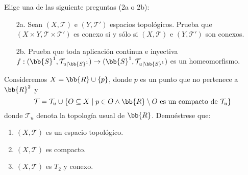 \documentclass[12pt]{article}
\newcounter{ejercicio}[section] %
\newcounter{ejercicio}
\newcommand{\resetearcontador}{%
  \setcounter{ejercicio}{0} %
}
\begin{document}
    \begin{ejercicio}[2.5 puntos]
        Elige una de las siguiente preguntas (2a o 2b):
        \begin{enumerate}
            \item[2a.] Sean $(X, \mathcal{T})$ e $(Y, \mathcal{T}')$ espacios topológicos. Prueba que $(X\times Y, \mathcal{T}\times \mathcal{T}')$ es conexo si y sólo si $(X, \mathcal{T})$ e $(Y, \mathcal{T}')$ son conexos.
            \item[2b.] Prueba que toda aplicación continua e inyectiva $f:(\bb{S}^1, \mathcal{T}_{u|\bb{S}^1}) \rightarrow (\bb{S}^1, \mathcal{T}_{u|\bb{S}^1})$ es un homeomorfismo.
        \end{enumerate}
    \end{ejercicio}


    \begin{ejercicio}[3 puntos]
        Consideremos $X = \bb{R} \cup \{p\}$, donde $p$ es un punto que no pertenece a $\bb{R}^2$ y 
        $$\mathcal{T} = \mathcal{T}_u \cup \{O \subseteq X \mid p \in O \land \bb{R}\setminus O \mbox{ es un compacto de } \mathcal{T}_u\}$$
        donde $\mathcal{T}_u$ denota la topología usual de $\bb{R}$. Demuéstrese que:
        \begin{enumerate}[label=(\alph*)]
            \item $(X,\mathcal{T})$ es un espacio topológico.
            \item $(X,\mathcal{T})$ es compacto.
            \item $(X,\mathcal{T})$ es $T_2$ y conexo.
        \end{enumerate}
    \end{ejercicio}
    
    \newpage
    \           %
    \newpage
    \resetearcontador
\end{document}

